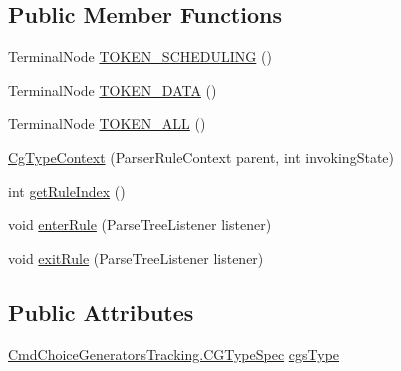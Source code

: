 \subsection*{Public Member Functions}
\begin{DoxyCompactItemize}
\item 
Terminal\+Node \hyperlink{classgov_1_1nasa_1_1jpf_1_1inspector_1_1client_1_1parser_1_1_console_grammar_parser_1_1_cg_type_context_a289e5137a391bf07663a1e7c4f10476c}{T\+O\+K\+E\+N\+\_\+\+S\+C\+H\+E\+D\+U\+L\+I\+NG} ()
\item 
Terminal\+Node \hyperlink{classgov_1_1nasa_1_1jpf_1_1inspector_1_1client_1_1parser_1_1_console_grammar_parser_1_1_cg_type_context_abba7ef0655109d31ba7a4b78e2df11c9}{T\+O\+K\+E\+N\+\_\+\+D\+A\+TA} ()
\item 
Terminal\+Node \hyperlink{classgov_1_1nasa_1_1jpf_1_1inspector_1_1client_1_1parser_1_1_console_grammar_parser_1_1_cg_type_context_a056cde3bb859f08e5ab96ec20a3b901c}{T\+O\+K\+E\+N\+\_\+\+A\+LL} ()
\item 
\hyperlink{classgov_1_1nasa_1_1jpf_1_1inspector_1_1client_1_1parser_1_1_console_grammar_parser_1_1_cg_type_context_abad4a9323f2be809e76a44d9e969fbed}{Cg\+Type\+Context} (Parser\+Rule\+Context parent, int invoking\+State)
\item 
int \hyperlink{classgov_1_1nasa_1_1jpf_1_1inspector_1_1client_1_1parser_1_1_console_grammar_parser_1_1_cg_type_context_a36b48eac74370f330ba185f5046ed691}{get\+Rule\+Index} ()
\item 
void \hyperlink{classgov_1_1nasa_1_1jpf_1_1inspector_1_1client_1_1parser_1_1_console_grammar_parser_1_1_cg_type_context_a704642043e251c447fc0dea0e6b5c3b6}{enter\+Rule} (Parse\+Tree\+Listener listener)
\item 
void \hyperlink{classgov_1_1nasa_1_1jpf_1_1inspector_1_1client_1_1parser_1_1_console_grammar_parser_1_1_cg_type_context_a0382dc393e6b618223c62bf1bdb1dcfd}{exit\+Rule} (Parse\+Tree\+Listener listener)
\end{DoxyCompactItemize}
\subsection*{Public Attributes}
\begin{DoxyCompactItemize}
\item 
\hyperlink{enumgov_1_1nasa_1_1jpf_1_1inspector_1_1client_1_1commands_1_1_cmd_choice_generators_tracking_1_1_c_g_type_spec}{Cmd\+Choice\+Generators\+Tracking.\+C\+G\+Type\+Spec} \hyperlink{classgov_1_1nasa_1_1jpf_1_1inspector_1_1client_1_1parser_1_1_console_grammar_parser_1_1_cg_type_context_aa1a25cd52c6c04c66fdcbec895482f56}{cgs\+Type}
\end{DoxyCompactItemize}


